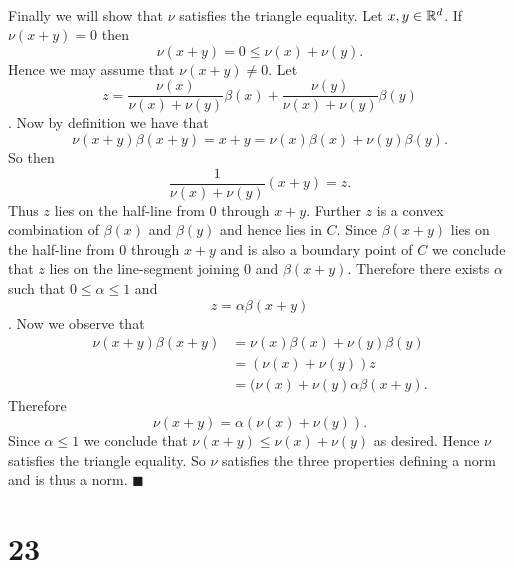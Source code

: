 \documentclass[letterpaper,12pt,oneside,onecolumn]{article}
\begin{document}
\paragraph{}
Finally we will show that $\nu$ satisfies the triangle equality. Let $x,y\in \mathbb{R}^d$. If $\nu(x+y) = 0$ then $$\nu(x+y) = 0 \leq \nu(x) + \nu(y).$$ Hence we may assume that $\nu(x+y) \neq 0$. Let $$z = \frac{\nu(x)}{\nu(x)+ \nu(y)} \beta(x) + \frac{\nu(y)}{\nu(x) + \nu(y)} \beta(y)$$. Now by definition we have that
$$\nu(x+y) \beta(x+y) = x+y = \nu(x) \beta(x) + \nu(y) \beta(y).$$
So then $$\frac{1}{\nu(x) + \nu(y)}(x+y) = z.$$
Thus $z$ lies on the half-line from $0$ through $x+y$. Further $z$ is a convex combination of $\beta(x)$ and $\beta(y)$ and hence lies in $C$. Since $\beta(x+y)$ lies on the half-line from $0$ through $x+y$ and is also a boundary point of $C$ we conclude that $z$ lies on the line-segment joining $0$ and $\beta(x+y)$. Therefore there exists $\alpha$ such that $0\leq \alpha\leq 1$ and $$z = \alpha \beta(x+y)$$.
Now we observe that
\begin{align*}
\nu(x+y) \beta(x+y) &= \nu(x) \beta(x) + \nu(y)\beta(y)\\
 &= (\nu(x) + \nu(y))z \\
&= (\nu(x) + \nu(y)\alpha \beta(x+y).
\end{align*}
Therefore
$$\nu(x+y) = \alpha(\nu(x) + \nu(y)).$$
Since $\alpha \leq 1$ we conclude that $\nu(x+y) \leq \nu(x) + \nu(y)$ as desired. Hence $\nu$ satisfies the triangle equality. So $\nu$ satisfies the three properties defining a norm and is thus a norm. $\blacksquare$
\section*{23}
\end{document}
